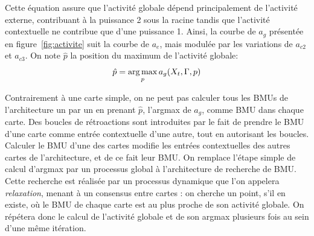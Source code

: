 Cette équation assure que l'activité globale dépend principalement de l'activité externe, contribuant à la puissance 2 sous la racine tandis que l'activité contextuelle ne contribue que d'une puissance 1. Ainsi, la courbe de $a_g$ présentée en figure~\ref{fig:activite} suit la courbe de $a_e$, mais modulée par les variations de $a_{c2}$ et $a_{c3}$.
On note $\hat{p}$ la position du maximum de l'activité globale:
\begin{equation}
\label{argmax}
\hat{p} = \operatorname*{arg\,max}_p a_g(X_t, \Gamma,p)
\end{equation}

Contrairement à une carte simple, on ne peut pas calculer tous les BMUs de l'architecture un par un en prenant $\hat{p}$, l'argmax de $a_g$, comme BMU dans chaque carte. Des boucles de rétroactions sont introduites par le fait de prendre le BMU d'une carte comme entrée contextuelle d'une autre, tout en autorisant les boucles. Calculer le BMU d'une des cartes modifie les entrées contextuelles des autres cartes de l'architecture, et de ce fait leur BMU. 
On remplace l'étape simple de calcul d'argmax par un processus global à l'architecture de recherche de BMU. Cette recherche est réalisée par un processus dynamique que l'on appelera \emph{relaxation}, menant à un consensus entre cartes : on cherche un point, s'il en existe, où le BMU de chaque carte est au plus proche de son activité globale. On répétera donc le calcul de l'activité globale et de son argmax plusieurs fois au sein d'une même itération.

